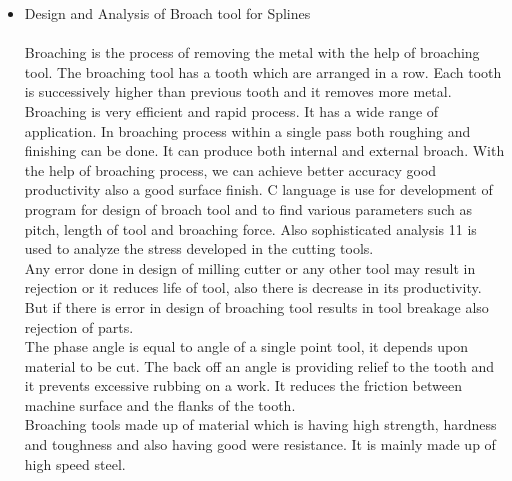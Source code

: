 \documentclass[16pt,a4paper]{article}
\begin{document}
\begin{itemize}
\item Design and Analysis of Broach tool for Splines\\      
\\Broaching is the process of removing the metal with the help of broaching tool. The broaching tool has a tooth which are arranged in a row. Each tooth is successively higher than previous tooth and it removes more metal. Broaching is very efficient and rapid process. It has a wide range of application. In broaching process within a single pass both roughing and finishing can be done. It can produce both internal and external broach. With the help of broaching process, we can achieve better accuracy good productivity also a good surface finish. 
C language is use for development of program for design of broach tool  and to find various parameters such as pitch, length of tool and broaching force. Also sophisticated analysis 11 is used to analyze the stress developed in the cutting tools. 
\\Any error done in design of milling cutter or any other tool may result in rejection or it reduces life of tool, also there is decrease in its productivity. But if there is error in design of broaching tool results in tool breakage also rejection of parts.
\\The phase angle is equal to angle of a single point tool, it depends upon material to be cut. The back off an angle is providing relief to the tooth and it prevents excessive rubbing on a work. It reduces the friction between machine surface and the flanks of the tooth.
\\Broaching tools made up of material which is having high strength, hardness and toughness and also having good were resistance. It is mainly made up of high speed steel.\\     


\end{itemize}
\end{document}
